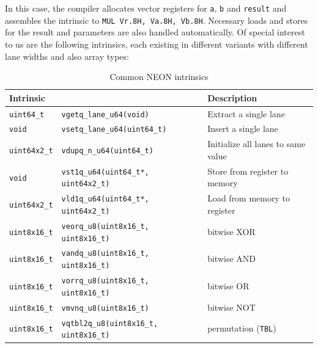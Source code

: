 In this case, the compiler allocates vector registers for \texttt{a},
\texttt{b} and \texttt{result} and assembles the intrinsic to \texttt{MUL
Vr.8H, Va.8H, Vb.8H}. Necessary loads and stores for the result and parameters
are also handled automatically. Of special interest to us are the following
intrinsics, each existing in different variants with different lane widths and
also array types: \\

\begin{table}[h!]
    \centering
    \footnotesize
    \begin{tabularx}{\textwidth}{llX}
        \toprule
        Intrinsic && Description \\
        \midrule
        \texttt{uint64\_t} & \texttt{vgetq\_lane\_u64(void)} & Extract a single lane \\
        \midrule
        \texttt{void} & \texttt{vsetq\_lane\_u64(uint64\_t)} & Insert a single lane \\
        \midrule
        \texttt{uint64x2\_t} & \texttt{vdupq\_n\_u64(uint64\_t)} & Initialize all lanes to same value \\
        \midrule
        \texttt{void} & \texttt{vst1q\_u64(uint64\_t*, uint64x2\_t)} & Store from register to memory \\
        \midrule
        \texttt{uint64x2\_t} & \texttt{vld1q\_u64(uint64\_t*, uint64x2\_t)} & Load from memory to register \\
        \midrule
        \texttt{uint8x16\_t} & \texttt{veorq\_u8(uint8x16\_t, uint8x16\_t)} & bitwise XOR \\
        \midrule
        \texttt{uint8x16\_t} & \texttt{vandq\_u8(uint8x16\_t, uint8x16\_t)} & bitwise AND \\
        \midrule
        \texttt{uint8x16\_t} & \texttt{vorrq\_u8(uint8x16\_t, uint8x16\_t)} & bitwise OR \\
        \midrule
        \texttt{uint8x16\_t} & \texttt{vmvnq\_u8(uint8x16\_t)} & bitwise NOT \\
        \midrule
        \texttt{uint8x16\_t} & \texttt{vqtbl2q\_u8(uint8x16\_t, uint8x16\_t)} & permutation (\texttt{TBL}) \\
        \bottomrule
    \end{tabularx}
    \caption{Common NEON intrinsics}
\end{table}
